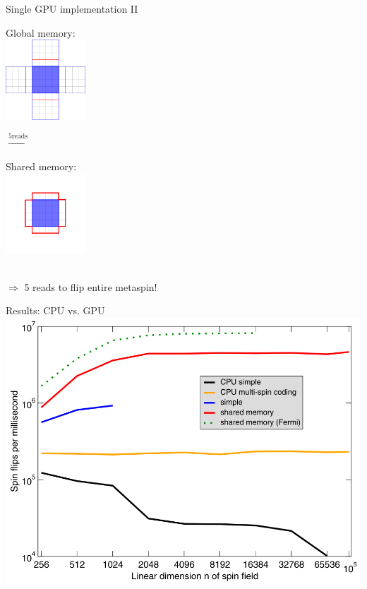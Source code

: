 \documentclass{beamer}
\begin{document}
\begin{frame}{Single GPU implementation II}
\begin{minipage}{0.3\textwidth}
    Global memory:\\
    \includegraphics[keepaspectratio=true, height=3cm]{images/neighbour_metaspins_marked.png}
\end{minipage}
\hspace{1cm}
\begin{minipage}{0.1\textwidth}
    \huge $\overset{5 \text{reads}}{\longrightarrow}$
\end{minipage}
\hspace{1cm}
\begin{minipage}{0.3\textwidth}
    Shared memory:\\
    \includegraphics[keepaspectratio=true, height=3cm]{images/neighbour_metaspins_marked_stored.png}
\end{minipage}\\
\vspace{1cm}
$\Rightarrow$ 5 reads to flip entire metaspin! %
%
\end{frame}

\begin{frame}{Results: CPU vs. GPU}
\includegraphics[keepaspectratio=true, width=\textwidth]{images/results1.png}
\end{frame}
\end{document}
